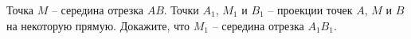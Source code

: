 \begin{ex}
	\begin{condition}
		Точка \( M \) – середина отрезка \( AB \). Точки \( A_1 \), \( M_1 \) и \( B_1 \) – проекции точек \( A \), \( M  \) и \( B  \) на некоторую прямую. Докажите, что \( M_1 \) – середина отрезка \( A_1B_1 \).
	\end{condition}
\end{ex}